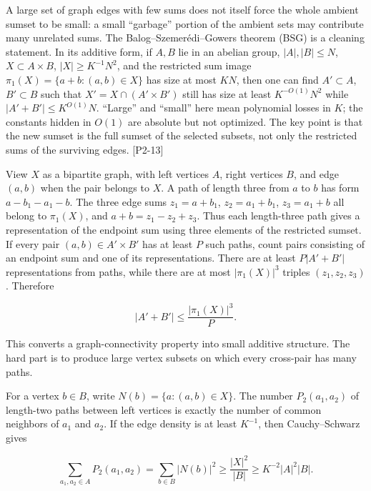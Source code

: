 A large set of graph edges with few sums does not itself force the whole ambient sumset to be small: a small ``garbage'' portion of the ambient sets may contribute many unrelated sums. The Balog--Szemerédi--Gowers theorem (BSG) is a cleaning statement. In its additive form, if \(A,B\) lie in an abelian group, \(|A|,|B|\le N\), \(X\subset A\times B\), \(|X|\ge K^{-1}N^2\), and the restricted sum image \(\pi_1(X)=\{a+b:(a,b)\in X\}\) has size at most \(KN\), then one can find \(A'\subset A\), \(B'\subset B\) such that \(X'=X\cap(A'\times B')\) still has size at least \(K^{-O(1)}N^2\) while \(|A'+B'|\le K^{O(1)}N\). ``Large'' and ``small'' here mean polynomial losses in \(K\); the constants hidden in \(O(1)\) are absolute but not optimized. The key point is that the new sumset is the full sumset of the selected subsets, not only the restricted sums of the surviving edges. {[}P2-13{]}

View \(X\) as a bipartite graph, with left vertices \(A\), right vertices \(B\), and edge \((a,b)\) when the pair belongs to \(X\). A path of length three from \(a\) to \(b\) has form \(a-b_1-a_1-b\). The three edge sums \(z_1=a+b_1\), \(z_2=a_1+b_1\), \(z_3=a_1+b\) all belong to \(\pi_1(X)\), and \(a+b=z_1-z_2+z_3\). Thus each length-three path gives a representation of the endpoint sum using three elements of the restricted sumset. If every pair \((a,b)\in A'\times B'\) has at least \(P\) such paths, count pairs consisting of an endpoint sum and one of its representations. There are at least \(P|A'+B'|\) representations from paths, while there are at most \(|\pi_1(X)|^3\) triples \((z_1,z_2,z_3)\). Therefore

\[|A'+B'|\le \frac{|\pi_1(X)|^3}{P}.\]

This converts a graph-connectivity property into small additive structure. The hard part is to produce large vertex subsets on which every cross-pair has many paths.

For a vertex \(b\in B\), write \(N(b)=\{a:(a,b)\in X\}\). The number \(P_2(a_1,a_2)\) of length-two paths between left vertices is exactly the number of common neighbors of \(a_1\) and \(a_2\). If the edge density is at least \(K^{-1}\), then Cauchy--Schwarz gives

\[\sum_{a_1,a_2\in A}P_2(a_1,a_2)=\sum_{b\in B}|N(b)|^2\ge \frac{|X|^2}{|B|}\ge K^{-2}|A|^2|B|.\]

